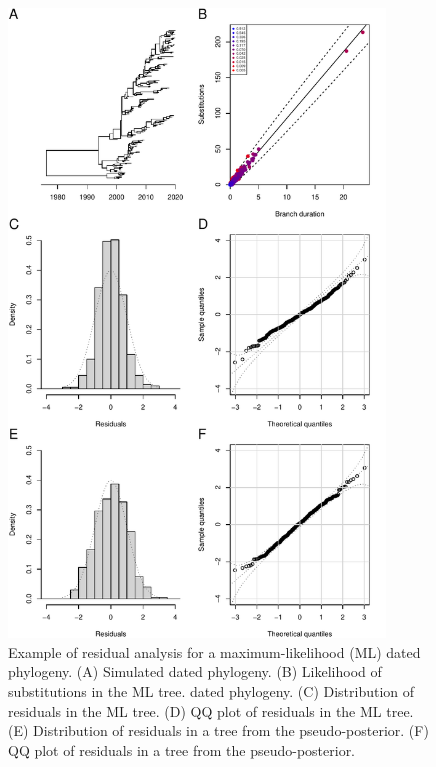 \documentclass{article}
\begin{document}
\begin{figure}[p!]
\begin{center}
\includegraphics[width=10cm]{exampleML.pdf}
\end{center}
\caption{Example of residual analysis for a maximum-likelihood (ML) dated phylogeny.
(A) Simulated dated phylogeny. (B) Likelihood of substitutions in the ML tree.
dated phylogeny. 
(C) Distribution of residuals in the ML tree. 
(D) QQ plot of residuals in the ML tree.
(E) Distribution of residuals in a tree from the pseudo-posterior. 
(F) QQ plot of residuals in a tree from the pseudo-posterior.
\label{fig:exampleML}}
\end{figure}
\end{document}
